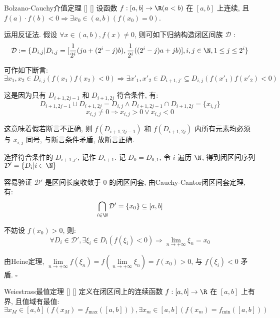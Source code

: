 \documentclass[UTF8]{ctexart}
\begin{document}
			\begin{thm}
			    []
			    {Bolzano-Cauchy介值定理}
			    []
			    []
				设函数 \(f:[a,b]\to\R(a<b)\) 在 \([a,b]\) 上连续, 且 \(f(a)\cdot f(b)<0\Longrightarrow\exists x_0\in(a,b)(f(x_0)=0)\). 
			\end{thm}

			\begin{prf}
			
				运用反证法. 假设 \(\forall x\in(a,b), f(x)\neq 0\), 则可如下归纳构造闭区间族 \(\mathcal{D}\) : 
				\[\mathcal{D}:=\{D_{i,j}|D_{i,j}=[\frac{1}{2^i}(ja+(2^i-j)b),\frac{1}{2^i}((2^i-j)a+jb)],i,j\in\N,1\leq j\leq 2^i\}\]

				可作如下断言: 
				\[\exists x_1,x_2\in D_{i,j}(f(x_1)f(x_2)<0)\Longrightarrow\exists x'_1,x'_2\in D_{i+1,j'}\subseteq D_{i,j}(f(x'_1)f(x'_2)<0)\]
				
				这是因为只有 \(D_{i+1,2j-1}\) 和 \(D_{i+1,2j}\) 符合条件, 有: 
				\[D_{i+1,2j-1}\cup D_{i+1,2j}=D_{i,j}\wedge D_{i+1,2j-1}\cap D_{i+1,2j}=\{x_{i,j}\}\]
				\[x_{i,j}\neq 0\Longrightarrow x_{i,j}>0\vee x_{i,j}<0\]
				
				这意味着假若断言不正确, 则 \(f(D_{i+1,2j-1})\) 和 \(f(D_{i+1,2j})\) 内所有元素均必须与 \(x_{i,j}\) 同号, 与断言条件矛盾, 故断言正确. 

				选择符合条件的 \(D_{i+1,j'}\), 记作 \(D_{i+1}\). 记 \(D_0=D_{0,1}\), 令 \(i\) 遍历 \(\N\), 得到闭区间序列\(\mathcal{D}'=\{D_i|i\in\N\}\)

				容易验证 \(\mathcal{D}'\) 是区间长度收敛于 \(0\) 的闭区间套, 由Cauchy-Cantor闭区间套定理, 有: 
				\[\bigcap_{i\in\N}\mathcal{D}'=\{x_0\}\subseteq[a,b]\]

				不妨设 \(f(x_0)>0\), 则: 
				\[\forall D_i\in\mathcal{D}', \exists\xi_i\in D_i(f(\xi_i)<0)\Longrightarrow\lim_{n\to+\infty}\xi_n=x_0\]

				由Heine定理, \(\lim\limits_{n\to+\infty}f(\xi_n)=f(\lim\limits_{n\to+\infty}\xi_n)=f(x_0)>0\), 与 \(f(\xi_i)<0\) 矛盾. \(\square\)
                \end{prf}
			
			\begin{thm}
			    []
			    {Weiestrass最值定理}
			    []
			    []
				定义在闭区间上的连续函数 \(f:[a,b]\to\R\) 在 \([a,b]\) 上有界, 且值域有最值: \[\exists x_M\in[a,b](f(x_M)=f_{\max}([a,b])),\exists x_m\in[a,b](f(x_m)=f_{\min}([a,b]))\]
			\end{thm}
\end{document}
